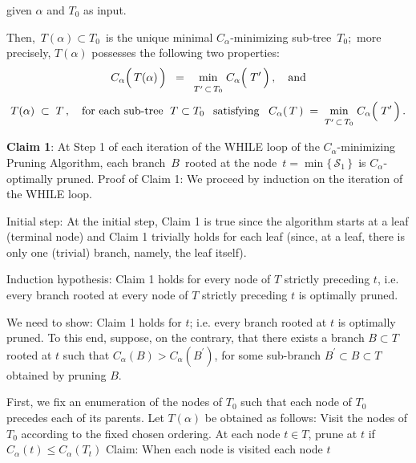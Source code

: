 \begin{proposition}
\begin{itemize}
	given $\alpha$ and $T_{0}$ as input.
\end{itemize}
Then, \,$T(\alpha) \subset T_{0}$\, is the unique
{\color{red}minimal $C_{\alpha}$-minimizing} sub-tree \,$T_{0}$;\,
more precisely, $T(\alpha)$ possesses the following two properties:
\begin{equation*}
C_{\alpha}\!\left(\,\overset{{\color{white}.}}{T}(\alpha)\,\right)
\;\; = \;\;
	\underset{T^{\prime} \,\overset{{\color{white}.}}{\subset}\, T_{0}}{\min}\;
	C_{\alpha}\!\left(\;\overset{{\color{white}.}}{T^{\prime}}\,\right),
\quad
\textnormal{and}
\end{equation*}
\begin{equation*}
T(\alpha) \; \subset \; T\,,
\quad
\textnormal{for each sub-tree \;$T \subset T_{0}$\;\, satisfying}\;\;\;
C_{\alpha}(\,T\,)
\; = \;
	\underset{T^{\prime} \,\overset{{\color{white}.}}{\subset}\, T_{0}}{\min}\;
	C_{\alpha}\!\left(\;\overset{{\color{white}.}}{T^{\prime}}\,\right).
\end{equation*}
\end{proposition}
\proof

\vskip 0.5cm
\noindent
\textbf{Claim 1}:\quad
At Step 1 of each iteration of the WHILE loop of the $C_{\alpha}$-minimizing Pruning Algorithm,
each branch \,$B$\, rooted at the node \,$t = \min\{\,\mathcal{S}_{1}\,\}$\, is $C_{\alpha}$-optimally pruned.
\vskip 0.2cm
\noindent
Proof of Claim 1:\quad
We proceed by induction on the iteration of the WHILE loop.

\vskip 0.2cm
\noindent
Initial step:\;
At the initial step, Claim 1 is true since the algorithm starts at a leaf (terminal node)
and Claim 1 trivially holds for each leaf (since, at a leaf, there is only one (trivial) branch, namely, the leaf itself).

\vskip 0.2cm
\noindent
Induction hypothesis:\;
Claim 1 holds for every node of $T$ strictly preceding $t$,
i.e. every branch rooted at every node of $T$ strictly preceding $t$ is optimally pruned.

\vskip 0.2cm
\noindent
We need to show:\;
Claim 1 holds for $t$;
i.e. every branch rooted at $t$ is optimally pruned.
To this end, suppose, on the contrary, that
there exists a branch $B \subset T$ rooted at $t$
such that
$C_{\alpha}(B) > C_{\alpha}(B^{\prime})$,
for some sub-branch $B^{\prime} \subset B \subset T$
obtained by pruning $B$.

\vskip 1.5cm
First, we fix an enumeration of the nodes of $T_{0}$ such that
each node of $T_{0}$ precedes each of its parents.
Let $T(\alpha)$ be obtained as follows:
Visit the nodes of $T_{0}$ according to the fixed chosen ordering.
At each node $t \in T$, prune at $t$ if $C_{\alpha}(t) \leq C_{\alpha}(T_{t})$
Claim: When each node is visited each node $t$

